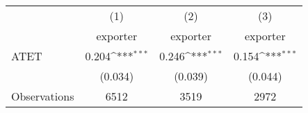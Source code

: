 {
\def\sym#1{\ifmmode^{#1}\else\(^{#1}\)\fi}
\begin{tabular}{l*{3}{c}}
\hline\hline
                    &\multicolumn{1}{c}{(1)}&\multicolumn{1}{c}{(2)}&\multicolumn{1}{c}{(3)}\\
                    &\multicolumn{1}{c}{exporter}&\multicolumn{1}{c}{exporter}&\multicolumn{1}{c}{exporter}\\
\hline
ATET                &       0.204\sym{***}&       0.246\sym{***}&       0.154\sym{***}\\
                    &     (0.034)         &     (0.039)         &     (0.044)         \\
\hline
Observations        &        6512         &        3519         &        2972         \\
\hline\hline
\end{tabular}
}
